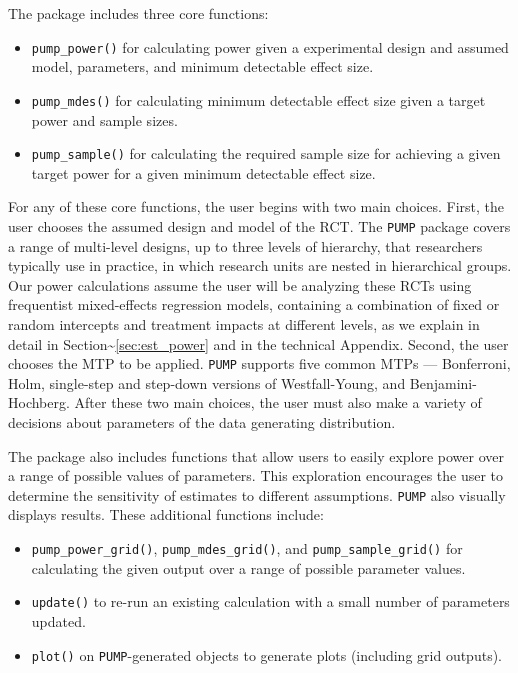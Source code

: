\documentclass[
]{article}
\providecommand{\tightlist}{%
  \setlength{\itemsep}{0pt}\setlength{\parskip}{0pt}}
\begin{document}
The package includes three core functions:

\begin{itemize}
\tightlist
\item
  \texttt{pump\_power()} for calculating power given a experimental
  design and assumed model, parameters, and minimum detectable effect
  size.
\item
  \texttt{pump\_mdes()} for calculating minimum detectable effect size
  given a target power and sample sizes.
\item
  \texttt{pump\_sample()} for calculating the required sample size for
  achieving a given target power for a given minimum detectable effect
  size.
\end{itemize}

For any of these core functions, the user begins with two main choices.
First, the user chooses the assumed design and model of the RCT. The
\texttt{PUMP} package covers a range of multi-level designs, up to three
levels of hierarchy, that researchers typically use in practice, in
which research units are nested in hierarchical groups. Our power
calculations assume the user will be analyzing these RCTs using
frequentist mixed-effects regression models, containing a combination of
fixed or random intercepts and treatment impacts at different levels, as
we explain in detail in Section\textasciitilde{}\ref{sec:est_power} and
in the technical Appendix. Second, the user chooses the MTP to be
applied. \texttt{PUMP} supports five common MTPs --- Bonferroni, Holm,
single-step and step-down versions of Westfall-Young, and
Benjamini-Hochberg. After these two main choices, the user must also
make a variety of decisions about parameters of the data generating
distribution.

The package also includes functions that allow users to easily explore
power over a range of possible values of parameters. This exploration
encourages the user to determine the sensitivity of estimates to
different assumptions. \texttt{PUMP} also visually displays results.
These additional functions include:

\begin{itemize}
\tightlist
\item
  \texttt{pump\_power\_grid()}, \texttt{pump\_mdes\_grid()}, and
  \texttt{pump\_sample\_grid()} for calculating the given output over a
  range of possible parameter values.
\item
  \texttt{update()} to re-run an existing calculation with a small
  number of parameters updated.
\item
  \texttt{plot()} on \texttt{PUMP}-generated objects to generate plots
  (including grid outputs).
\end{itemize}
\end{document}
